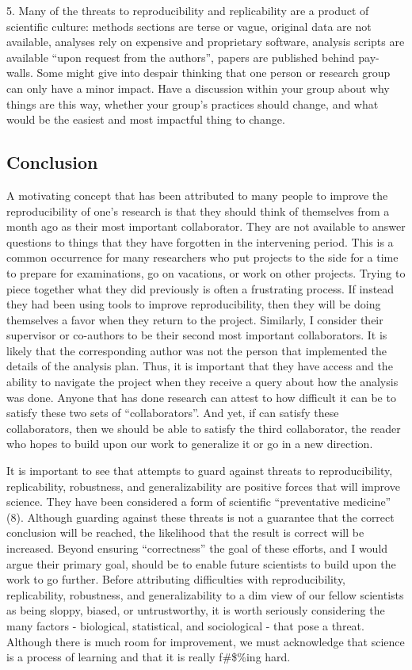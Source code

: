 \documentclass[]{article}
\begin{document}
5. Many of the threats to reproducibility and replicability are a
product of scientific culture: methods sections are terse or vague,
original data are not available, analyses rely on expensive and
proprietary software, analysis scripts are available ``upon request from
the authors'', papers are published behind pay-walls. Some might give
into despair thinking that one person or research group can only have a
minor impact. Have a discussion within your group about why things are
this way, whether your group's practices should change, and what would
be the easiest and most impactful thing to change.

\subsection{Conclusion}\label{conclusion}

A motivating concept that has been attributed to many people to improve
the reproducibility of one's research is that they should think of
themselves from a month ago as their most important collaborator. They
are not available to answer questions to things that they have forgotten
in the intervening period. This is a common occurrence for many
researchers who put projects to the side for a time to prepare for
examinations, go on vacations, or work on other projects. Trying to
piece together what they did previously is often a frustrating process.
If instead they had been using tools to improve reproducibility, then
they will be doing themselves a favor when they return to the project.
Similarly, I consider their supervisor or co-authors to be their second
most important collaborators. It is likely that the corresponding author
was not the person that implemented the details of the analysis plan.
Thus, it is important that they have access and the ability to navigate
the project when they receive a query about how the analysis was done.
Anyone that has done research can attest to how difficult it can be to
satisfy these two sets of ``collaborators''. And yet, if can satisfy
these collaborators, then we should be able to satisfy the third
collaborator, the reader who hopes to build upon our work to generalize
it or go in a new direction.

It is important to see that attempts to guard against threats to
reproducibility, replicability, robustness, and generalizability are
positive forces that will improve science. They have been considered a
form of scientific ``preventative medicine'' (8). Although guarding
against these threats is not a guarantee that the correct conclusion
will be reached, the likelihood that the result is correct will be
increased. Beyond ensuring ``correctness'' the goal of these efforts,
and I would argue their primary goal, should be to enable future
scientists to build upon the work to go further. Before attributing
difficulties with reproducibility, replicability, robustness, and
generalizability to a dim view of our fellow scientists as being sloppy,
biased, or untrustworthy, it is worth seriously considering the many
factors - biological, statistical, and sociological - that pose a
threat. Although there is much room for improvement, we must acknowledge
that science is a process of learning and that it is really f\#\$\%ing
hard.
\end{document}
